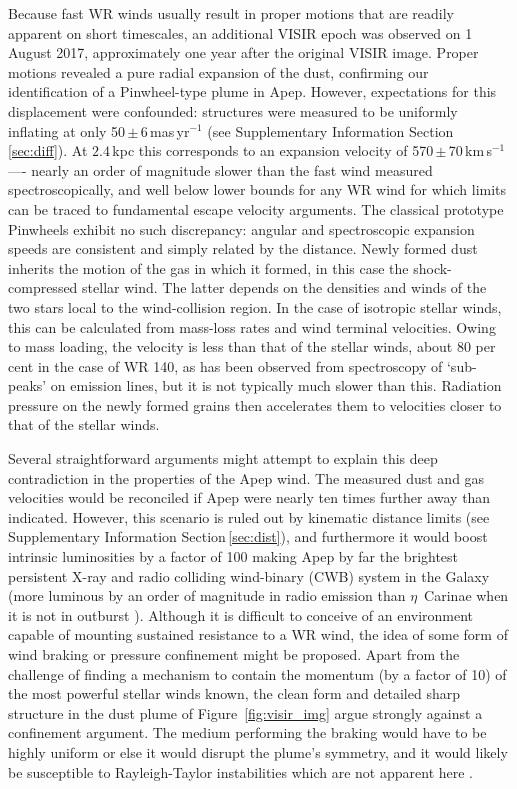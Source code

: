 \documentclass[preprint,times]{aastex61}
\begin{document}
Because fast WR winds usually result in proper motions that are readily apparent on short timescales, an additional VISIR epoch was observed on 1 August 2017, approximately one year after the original VISIR image. Proper motions revealed a pure radial expansion of the dust, confirming our identification of a Pinwheel-type plume in Apep. However, expectations for this displacement were confounded: structures were measured to be uniformly inflating at only 50\,$\pm$\,6\,mas\,yr$^{-1}$ (see Supplementary Information Section\,\ref{sec:diff}). At $2.4$\,kpc this corresponds to an expansion velocity of 570\,$\pm$\,70\,km\,s$^{-1}$ —- nearly an order of magnitude slower than the fast wind measured spectroscopically, and well below lower bounds for any WR wind \citep{2007ARA&A..45..177C} for which limits can be traced to fundamental escape velocity arguments. The classical prototype Pinwheels exhibit no such discrepancy: angular and spectroscopic expansion speeds are consistent and simply related by the distance. Newly formed dust inherits the motion of the gas in which it formed, in this case the shock-compressed stellar wind. The latter depends on the densities and winds of the two stars local to the wind-collision region. In the case of isotropic stellar winds, this can be calculated from mass-loss rates and wind terminal velocities\citep{Canto1996}. Owing to mass loading, the velocity is less than that of the stellar winds, about 80 per cent in the case of WR 140, as has been observed from spectroscopy of `sub-peaks' on emission lines\citep{Marchenko2003}, but it is not typically much slower than this. Radiation pressure on the newly formed grains then accelerates them to velocities closer to that of the stellar winds\citep{Williams2009}.

Several straightforward arguments might attempt to explain this deep contradiction in the properties of the Apep wind. The measured dust and gas velocities would be reconciled if Apep were nearly ten times further away than indicated. However, this scenario is ruled out by kinematic distance limits (see Supplementary Information Section\,\ref{sec:dist}), and furthermore it would boost intrinsic luminosities by a factor of 100 making Apep by far the brightest persistent X-ray and radio colliding wind-binary (CWB) system in the Galaxy \citep{2018MNRAS.474.3228P} (more luminous by an order of magnitude in radio emission than $\eta$~Carinae when it is not in outburst \citep{2013A&A...558A..28D}). Although it is difficult to conceive of an environment capable of mounting sustained resistance to a WR wind, the idea of some form of wind braking or pressure confinement might be proposed. Apart from the challenge of finding a mechanism to contain the momentum (by a factor of 10) of the most powerful stellar winds known, the clean form and detailed sharp structure in the dust plume of Figure~\ref{fig:visir_img} argue strongly against a confinement argument. The medium performing the braking would have to be highly uniform or else it would disrupt the plume's symmetry, and it would likely be susceptible to Rayleigh-Taylor instabilities which are not apparent here \citep{2009MNRAS.400..629P}. 
\end{document}
